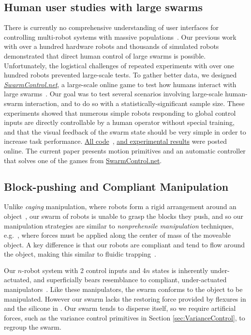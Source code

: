 \subsection{Human user studies with large swarms}
There is currently no comprehensive understanding of user interfaces for controlling multi-robot systems with massive populations~\cite{Nunnally2012HSI}.  
Our previous work with over a hundred hardware robots and thousands of simulated robots~\cite{Becker2013b} demonstrated that direct human control of large swarms is possible. Unfortunately, the logistical challenges of repeated experiments with over one hundred robots prevented large-scale tests. To gather better data, we designed \href{http://www.swarmcontrol.net/show_results}{\emph{SwarmControl.net}}, a large-scale online game to test how humans interact with large swarms~\cite{Becker2014e}.  Our goal was to test several scenarios involving large-scale human-swarm interaction, and to do so with a statistically-significant sample size. These  experiments showed that numerous simple robots responding to global control inputs are directly controllable by a human operator without special training, and that the visual feedback of the swarm state should be very simple in order to increase task performance. \href{https://github.com/crertel/swarmmanipulate.git}{All code}~\cite{Chris-Ertel2013}, \href{http://www.swarmcontrol.net/show_results}{and experimental results} were posted online. The current paper presents motion primitives and an automatic controller that solves one of the games from \href{http://www.swarmcontrol.net/task/varying_visualization}{SwarmControl.net}.


\subsection{Block-pushing and Compliant Manipulation}
Unlike \emph{caging} manipulation, where robots form a rigid arrangement around an object~\cite{Sudsang2002,Fink2007}, our swarm of robots is unable to grasp the blocks they push, and so our manipulation strategies are similar to \emph{nonprehensile manipulation} techniques, e.g.~\cite{Lynch1999}, where forces must be applied along the center of mass of the moveable object. A key difference is that our robots are compliant and tend to flow around the object, making this similar to fluidic trapping~\cite{Armani2006,Becker2009}.  

Our $n$-robot system with 2 control inputs and 4$n$ states is inherently under-actuated, and superficially bears resemblance to compliant, under-actuated manipulators~\cite{odhner2014compliant,deimel2014novel}.  Like these manipulators, the swarm conforms to the object to be manipulated.  However our swarm lacks the restoring force provided by flexures in \cite{odhner2014compliant} and the silicone in \cite{deimel2014novel}.  Our swarm tends to disperse itself, so we require  artificial forces, such as the variance control primitives in Section \ref{sec:VarianceControl},
 to regroup the swarm.

